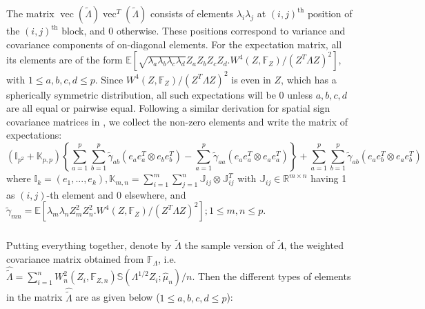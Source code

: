 \documentclass[ejs]{imsart}
\newcommand{\BE}{{\mathbb{E}}}
\newcommand{\BF}{{\mathbb{F}}}
\newcommand{\BI}{{\mathbb{I}}}
\newcommand{\BJ}{{\mathbb{J}}}
\newcommand{\BK}{{\mathbb{K}}}
\newcommand{\BR}{{\mathbb{R}}}
\newcommand{\BS}{{\mathbb{S}}}
\DeclareMathOperator*{\ve}{vec}
\theoremstyle{definition} \newtheorem{Definition}[Theorem]{Definition}
\begin{document}
The matrix $\ve( \tilde\Lambda) \ve^T(\tilde\Lambda)$ consists of elements $\lambda_i\lambda_j$ at $(i,j)^\text{th}$ position of the $(i,j)^\text{th}$ block, and 0 otherwise. These positions correspond to variance and covariance components of on-diagonal elements. For the expectation matrix, all its elements are of the form $ \BE[ \sqrt{\lambda_a \lambda_b \lambda_c \lambda_d} Z_a Z_b Z_c Z_d . W^4 (Z, \BF_Z) / (Z^T \Lambda Z)^2]$, with $1 \leq a,b,c,d \leq p$. Since $W^4 (Z, \BF_Z) / (Z^T \Lambda Z)^2$ is even in $Z$, which has a spherically symmetric distribution, all such expectations will be 0 unless $a,b,c,d$ are all equal or pairwise equal. Following a similar derivation for spatial sign covariance matrices in \cite{ref:Biometrika14673_MagyarTyler}, we collect the non-zero elements and write the matrix of expectations:
%
$$ (\BI_{p^2} + \BK_{p,p}) \left\{ \sum_{a=1}^p \sum_{b=1}^p \tilde\gamma_{ab} (e_a e_a^T \otimes  e_b e_b^T) - \sum_{a=1}^p \tilde\gamma_{aa} (e_a e_a^T \otimes  e_a e_a^T) \right\} + \sum_{a=1}^p \sum_{b=1}^p \tilde\gamma_{ab} (e_a e_b^T \otimes  e_a e_b^T) $$
%
where $\BI_k = (e_1,...,e_k), \BK_{m,n} = \sum_{i=1}^m \sum_{j=1}^n \BJ_{ij} \otimes \BJ_{ij}^T$ with $\BJ_{ij} \in \BR^{m \times n}$ having 1 as $(i,j)$-th element and 0 elsewhere, and $\tilde\gamma_{mn} = \BE[ \lambda_m \lambda_n Z_m^2 Z_n ^2 . W^4 (Z, \BF_Z) / (Z^T \Lambda Z)^2]; 1 \leq m,n \leq p$.

\paragraph{}Putting everything together, denote by $\hat {\tilde \Lambda}$ the sample version of $\tilde \Lambda$, the weighted covariance matrix obtained from $\BF_\Lambda$, i.e. $\hat {\tilde \Lambda} = \sum_{i=1}^n W_n^2 (Z_i, \BF_{Z,n}) \BS( \Lambda^{1/2} Z_i; \hat \mu_n)/n $. Then the different types of elements in the matrix $\hat {\tilde \Lambda}$ are as given below ($1 \leq a,b,c,d \leq p$):
\end{document}
